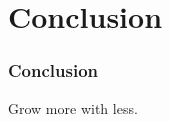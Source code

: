 
\section{Conclusion}

\begin{frame}
    \frametitle{Conclusion}
    Grow more with less.
\end{frame}